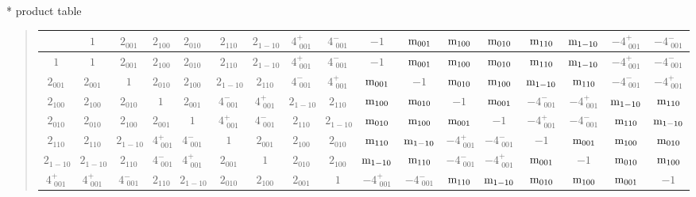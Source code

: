 \documentclass[fleqn,10pt,landscape]{jsarticle}
\begin{document}
* product table
\begin{quote}
\begin{tabular}{ccccccccccccccccc} \hline \hline
 & $ 1 $ & $ 2{}_{001} $ & $ 2{}_{100} $ & $ 2{}_{010} $ & $ 2{}_{110} $ & $ 2{}_{1-10} $ & $ 4^{+}_{\,\,001} $ & $ 4^{-}_{\,\,001} $ & $ -1 $ & $ {\rm m}_{001} $ & $ {\rm m}_{100} $ & $ {\rm m}_{010} $ & $ {\rm m}_{110} $ & $ {\rm m}_{1-10} $ & $ -4^{+}_{\,\,001} $ & $ -4^{-}_{\,\,001} $ \\ \hline
$ 1 $ & $ 1 $ & $ 2{}_{001} $ & $ 2{}_{100} $ & $ 2{}_{010} $ & $ 2{}_{110} $ & $ 2{}_{1-10} $ & $ 4^{+}_{\,\,001} $ & $ 4^{-}_{\,\,001} $ & $ -1 $ & $ {\rm m}_{001} $ & $ {\rm m}_{100} $ & $ {\rm m}_{010} $ & $ {\rm m}_{110} $ & $ {\rm m}_{1-10} $ & $ -4^{+}_{\,\,001} $ & $ -4^{-}_{\,\,001} $ \\
$ 2{}_{001} $ & $ 2{}_{001} $ & $ 1 $ & $ 2{}_{010} $ & $ 2{}_{100} $ & $ 2{}_{1-10} $ & $ 2{}_{110} $ & $ 4^{-}_{\,\,001} $ & $ 4^{+}_{\,\,001} $ & $ {\rm m}_{001} $ & $ -1 $ & $ {\rm m}_{010} $ & $ {\rm m}_{100} $ & $ {\rm m}_{1-10} $ & $ {\rm m}_{110} $ & $ -4^{-}_{\,\,001} $ & $ -4^{+}_{\,\,001} $ \\
$ 2{}_{100} $ & $ 2{}_{100} $ & $ 2{}_{010} $ & $ 1 $ & $ 2{}_{001} $ & $ 4^{-}_{\,\,001} $ & $ 4^{+}_{\,\,001} $ & $ 2{}_{1-10} $ & $ 2{}_{110} $ & $ {\rm m}_{100} $ & $ {\rm m}_{010} $ & $ -1 $ & $ {\rm m}_{001} $ & $ -4^{-}_{\,\,001} $ & $ -4^{+}_{\,\,001} $ & $ {\rm m}_{1-10} $ & $ {\rm m}_{110} $ \\
$ 2{}_{010} $ & $ 2{}_{010} $ & $ 2{}_{100} $ & $ 2{}_{001} $ & $ 1 $ & $ 4^{+}_{\,\,001} $ & $ 4^{-}_{\,\,001} $ & $ 2{}_{110} $ & $ 2{}_{1-10} $ & $ {\rm m}_{010} $ & $ {\rm m}_{100} $ & $ {\rm m}_{001} $ & $ -1 $ & $ -4^{+}_{\,\,001} $ & $ -4^{-}_{\,\,001} $ & $ {\rm m}_{110} $ & $ {\rm m}_{1-10} $ \\
$ 2{}_{110} $ & $ 2{}_{110} $ & $ 2{}_{1-10} $ & $ 4^{+}_{\,\,001} $ & $ 4^{-}_{\,\,001} $ & $ 1 $ & $ 2{}_{001} $ & $ 2{}_{100} $ & $ 2{}_{010} $ & $ {\rm m}_{110} $ & $ {\rm m}_{1-10} $ & $ -4^{+}_{\,\,001} $ & $ -4^{-}_{\,\,001} $ & $ -1 $ & $ {\rm m}_{001} $ & $ {\rm m}_{100} $ & $ {\rm m}_{010} $ \\
$ 2{}_{1-10} $ & $ 2{}_{1-10} $ & $ 2{}_{110} $ & $ 4^{-}_{\,\,001} $ & $ 4^{+}_{\,\,001} $ & $ 2{}_{001} $ & $ 1 $ & $ 2{}_{010} $ & $ 2{}_{100} $ & $ {\rm m}_{1-10} $ & $ {\rm m}_{110} $ & $ -4^{-}_{\,\,001} $ & $ -4^{+}_{\,\,001} $ & $ {\rm m}_{001} $ & $ -1 $ & $ {\rm m}_{010} $ & $ {\rm m}_{100} $ \\
$ 4^{+}_{\,\,001} $ & $ 4^{+}_{\,\,001} $ & $ 4^{-}_{\,\,001} $ & $ 2{}_{110} $ & $ 2{}_{1-10} $ & $ 2{}_{010} $ & $ 2{}_{100} $ & $ 2{}_{001} $ & $ 1 $ & $ -4^{+}_{\,\,001} $ & $ -4^{-}_{\,\,001} $ & $ {\rm m}_{110} $ & $ {\rm m}_{1-10} $ & $ {\rm m}_{010} $ & $ {\rm m}_{100} $ & $ {\rm m}_{001} $ & $ -1 $ \\

\end{tabular}
\end{quote}
\end{document}
